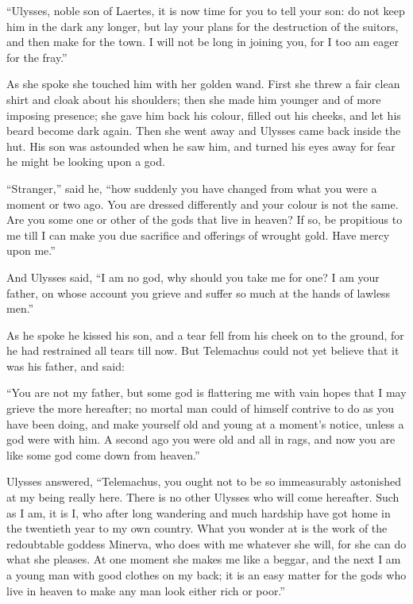 “Ulysses, noble son of Laertes, it is now time for you to tell your son: do not
keep him in the dark any longer, but lay your plans for the destruction of the
suitors, and then make for the town. I will not be long in joining you, for I
too am eager for the fray.”

As she spoke she touched him with her golden wand. First she threw a fair clean
shirt and cloak about his shoulders; then she made him younger and of more
imposing presence; she gave him back his colour, filled out his cheeks, and let
his beard become dark again. Then she went away and Ulysses came back inside
the hut. His son was astounded when he saw him, and turned his eyes away for
fear he might be looking upon a god.

“Stranger,” said he, “how suddenly you have changed from what you were a moment
or two ago. You are dressed differently and your colour is not the same. Are
you some one or other of the gods that live in heaven? If so, be propitious to
me till I can make you due sacrifice and offerings of wrought gold. Have mercy
upon me.”

And Ulysses said, “I am no god, why should you take me for one? I am your
father, on whose account you grieve and suffer so much at the hands of lawless
men.”

As he spoke he kissed his son, and a tear fell from his cheek on to the ground,
for he had restrained all tears till now. But Telemachus could not yet believe
that it was his father, and said:

“You are not my father, but some god is flattering me with vain hopes that I
may grieve the more hereafter; no mortal man could of himself contrive to do as
you have been doing, and make yourself old and young at a moment’s notice,
unless a god were with him. A second ago you were old and all in rags, and now
you are like some god come down from heaven.”

Ulysses answered, “Telemachus, you ought not to be so immeasurably astonished
at my being really here. There is no other Ulysses who will come hereafter.
Such as I am, it is I, who after long wandering and much hardship have got home
in the twentieth year to my own country. What you wonder at is the work of the
redoubtable goddess Minerva, who does with me whatever she will, for she can do
what she pleases. At one moment she makes me like a beggar, and the next I am a
young man with good clothes on my back; it is an easy matter for the gods who
live in heaven to make any man look either rich or poor.”

